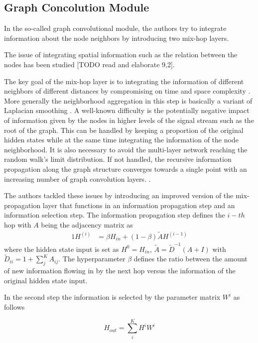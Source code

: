 \documentclass[letterpaper,twocolumn,12pt]{article}
\begin{document}
    \subsection{Graph Concolution Module}
    In the so-called graph convolutional module, the authors try to integrate information about the node neighbors by introducing two mix-hop layers.

    The issue of integrating spatial information such as the relation between the nodes has been studied [TODO read and elaborate 9,2].

    The key goal of the mix-hop layer is to integrating the information of different neighbors of different distances by compromising on time and space complexity \cite{AbuElHaija}.
    More generally the neighborhood aggregation in this step is basically a variant of Laplacian smoothing \cite{leskovec2005graphs}.
    A well-known difficulty is the potentially negative impact of information given by the nodes in higher levels of the signal stream such as the root of the graph.
    This can be handled by keeping a proportion of the original hidden states while at the same time integrating the information
    of the node neighborhood.
    It is also necessary to avoid the multi-layer network reaching the random walk's limit distribution.
    If not handled, the recursive information propagation along the graph structure converges towards a single point with an increasing number of graph convolution layers. \cite{klicpera2018predict}.

    The authors tackled these issues by introducing an improved version of the mix-propagation layer that functions in an
    information propagation step and an information selection step.
    The information propagation step defines the $i-th$ hop with $A$ being the adjacency matrix as
    \begin{alignat}{1}
        H^{(i)} &= \beta H_{in} + (1-\beta) \tilde{A} H^{(i-1)} \label{eq:hop}
    \end{alignat}
    where the hidden state input is set as $H^0 = H_{in}$, $\tilde{A} = \tilde{D}^{-1}(A +I)$ with $\tilde{D}_{ii}=1 + \sum_{j}^{K}A_{ij}$.
    The hyperparameter $\beta$ defines the ratio between the amount of new information flowing in by the next hop versus the information of the original hidden state input.

    In the second step the information is selected by the parameter matrix $W^{i}$ as follows

    \begin{equation}
        H_{out} =\sum_{i}^{K} H^i W^i  \label{eq:hop_selection}
    \end{equation}
\end{document}
